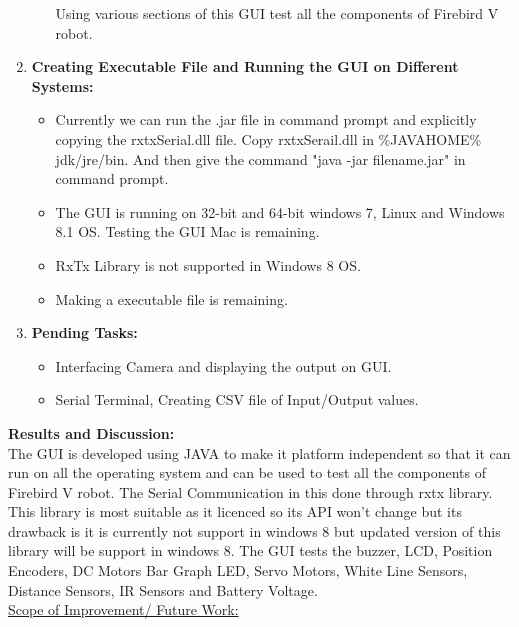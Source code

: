 \documentclass{article}
\begin{document}
\begin{enumerate}
\begin{itemize}
\begin{figure}[h]
\begin{center}
				\end{center}
			 \end{figure}
			 Using various sections of this GUI test all the components of Firebird V robot.  
		\end{itemize}
		\item \textbf{\large Creating Executable File and Running the GUI on Different Systems:} \\
		\begin{itemize}
			\item Currently we can run the .jar file in command prompt and explicitly copying the rxtxSerial.dll file. Copy rxtxSerail.dll in \%JAVAHOME\% jdk/jre/bin. And then give the command "java -jar filename.jar" in command prompt.
			\item The GUI is running on 32-bit and 64-bit windows 7, Linux and Windows 8.1 OS. Testing the GUI Mac is remaining.
			\item RxTx Library is not supported in Windows 8 OS.
			\item Making a executable file is remaining.
		\end{itemize} 
		\item \large \textbf{Pending Tasks:}
		\begin{itemize}
			\item Interfacing Camera and displaying the output on GUI.
			\item Serial Terminal, Creating CSV file of Input/Output values. 
		\end{itemize}
	\end{enumerate} 
	\newpage
	\textbf{\huge Results and Discussion:} \vspace{1cm} \\
	 The GUI is developed using JAVA to make it platform independent so that it can run on all the operating system and can be used to test all the components of Firebird V robot. The Serial Communication in this done through rxtx library. This library is most suitable as it licenced so its API won't change but its drawback is it is currently not support in windows 8 but updated version of this library will be support in windows 8. The GUI tests the buzzer, LCD, Position Encoders, DC Motors Bar Graph LED, Servo Motors, White Line Sensors, Distance Sensors, IR Sensors and Battery Voltage. \vspace{1cm} \\  
	 \underline{Scope of Improvement/ Future Work:}
\end{document}
